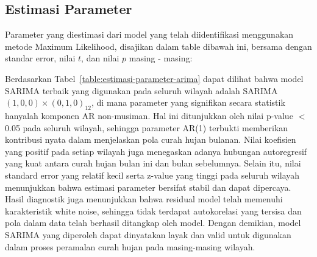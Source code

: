 \subsection{Estimasi Parameter}
Parameter yang diestimasi dari model yang telah diidentifikasi menggunakan metode Maximum Likelihood, disajikan dalam table dibawah ini, bersama dengan standar error, nilai $t$, dan nilai $p$ masing - masing:

Berdasarkan Tabel~\ref{table:estimasi-parameter-arima} dapat dilihat bahwa model SARIMA terbaik yang digunakan pada seluruh wilayah adalah SARIMA $(1,0,0) \times (0,1,0)_{12}$, di mana parameter yang signifikan secara statistik hanyalah komponen AR non-musiman.
Hal ini ditunjukkan oleh nilai p-value $<$ 0.05 pada seluruh wilayah, sehingga parameter AR(1) terbukti memberikan kontribusi nyata dalam menjelaskan pola curah hujan bulanan.
Nilai koefisien yang positif pada setiap wilayah juga menegaskan adanya hubungan autoregresif yang kuat antara curah hujan bulan ini dan bulan sebelumnya.
Selain itu, nilai standard error yang relatif kecil serta z-value yang tinggi pada seluruh wilayah menunjukkan bahwa estimasi parameter bersifat stabil dan dapat dipercaya.
Hasil diagnostik juga menunjukkan bahwa residual model telah memenuhi karakteristik white noise, sehingga tidak terdapat autokorelasi yang tersisa dan pola dalam data telah berhasil ditangkap oleh model.
Dengan demikian, model SARIMA yang diperoleh dapat dinyatakan layak dan valid untuk digunakan dalam proses peramalan curah hujan pada masing-masing wilayah.

